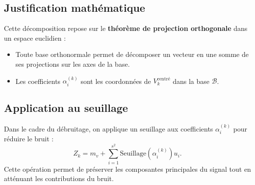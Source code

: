 \documentclass{article}
\begin{document}
\subsection*{Justification mathématique}
Cette décomposition repose sur le \textbf{théorème de projection orthogonale} dans un espace euclidien :
\begin{itemize}
    \item Toute base orthonormale permet de décomposer un vecteur en une somme de ses projections sur les axes de la base.
    \item Les coefficients $\alpha_i^{(k)}$ sont les coordonnées de $V_k^{\text{centré}}$ dans la base $\mathcal{B}$.
\end{itemize}

\subsection*{Application au seuillage}
Dans le cadre du débruitage, on applique un seuillage aux coefficients $\alpha_i^{(k)}$ pour réduire le bruit :
\[
Z_k = m_v + \sum_{i=1}^{s^2} \text{Seuillage}(\alpha_i^{(k)}) u_i.
\]
Cette opération permet de préserver les composantes principales du signal tout en atténuant les contributions du bruit.
\end{document}
